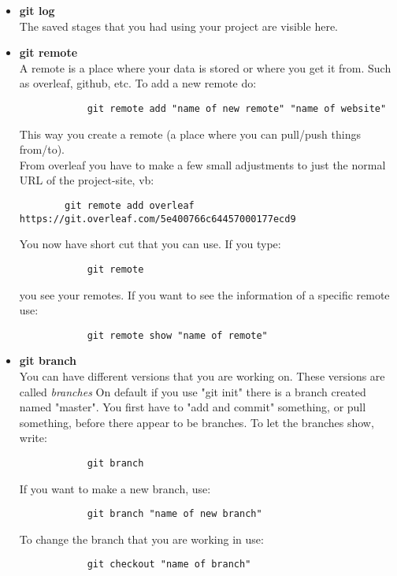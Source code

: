 \documentclass{article}
\begin{document}
\begin{itemize}
\begin{itemize}
        \item \textbf{git log} \\
        The saved stages that you had using your project are visible here. \\
        
        \item \textbf{git remote} \\
        A remote is a place where your data is stored or where you get it from. Such as overleaf, github, etc.
        To add a new remote do:
        \begin{verbatim}
            git remote add "name of new remote" "name of website"
        \end{verbatim}
        This way you create a remote (a place where you can pull/push things from/to). \\
        From overleaf you have to make a few small adjustments to just the normal URL of the project-site, vb: 
        \begin{verbatim}
        git remote add overleaf https://git.overleaf.com/5e400766c64457000177ecd9
        \end{verbatim}
        You now have short cut that you can use. If you type:
        \begin{verbatim}
            git remote
        \end{verbatim}
        you see your remotes. If you want to see the information of a specific remote use:
        \begin{verbatim}
            git remote show "name of remote"
        \end{verbatim}
        
        \item \textbf{git branch} \\
        You can have different versions that you are working on. These versions are called \textit{branches} On default if you use "git init" there is a branch created named "master". You first have to "add and commit" something, or pull something, before there appear to be branches. To let the branches show, write:
        \begin{verbatim}
            git branch
        \end{verbatim}
        If you want to make a new branch, use:
        \begin{verbatim}
            git branch "name of new branch"
        \end{verbatim}
        To change the branch that you are working in use:
        \begin{verbatim}
            git checkout "name of branch"
        \end{verbatim}
        

\end{itemize}
\end{itemize}
\end{document}
